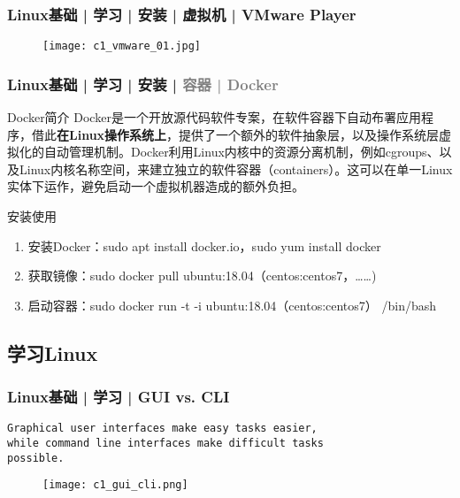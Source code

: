\begin{frame}
  \frametitle{Linux基础 | 学习 | 安装 | 虚拟机 | VMware Player}
  \begin{figure}
    \centering
    \texttt{[image: c1\_vmware\_01.jpg]}
  \end{figure}
\end{frame}

\begin{frame}
  \frametitle{Linux基础 | 学习 | 安装 | \textcolor{gray}{容器 | Docker}}
  \begin{block}{Docker简介}
    Docker是一个开放源代码软件专案，在软件容器下自动布署应用程序，借此\textbf{在Linux操作系统上}，提供了一个额外的软件抽象层，以及操作系统层虚拟化的自动管理机制。Docker利用Linux内核中的资源分离机制，例如cgroups、以及Linux内核名称空间，来建立独立的软件容器（containers）。这可以在单一Linux实体下运作，避免启动一个虚拟机器造成的额外负担。
  \end{block}
  \pause
  \begin{block}{安装使用}
    \begin{enumerate}
      \item 安装Docker：sudo apt install docker.io，sudo yum install docker
      \item 获取镜像：sudo docker pull ubuntu:18.04（centos:centos7，……)
      \item 启动容器：sudo docker run -t -i ubuntu:18.04（centos:centos7） /bin/bash
    \end{enumerate}
  \end{block}
\end{frame}

\subsection{学习Linux}
\begin{frame}[fragile]
  \frametitle{Linux基础 | 学习 | GUI vs. CLI}
  \begin{verbatim}
Graphical user interfaces make easy tasks easier,
while command line interfaces make difficult tasks
possible.
  \end{verbatim}
  \vspace{-0.8cm}
  \begin{figure}
    \centering
    \texttt{[image: c1\_gui\_cli.png]}
  \end{figure}
\end{frame}

